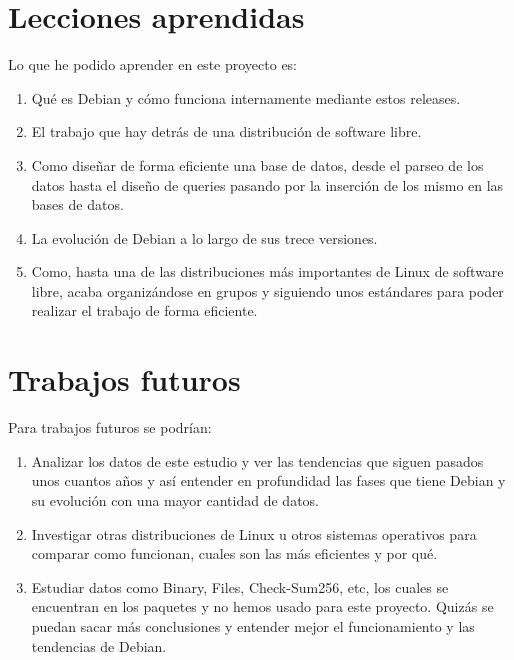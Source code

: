 \documentclass[a4paper, 12pt]{book}
\begin{document}
\section{Lecciones aprendidas}
\label{sec:lecciones_aprendidas}

Lo que he podido aprender en este proyecto es:

\begin{enumerate}
  \item Qué es Debian y cómo funciona internamente mediante estos releases.
  \item El trabajo que hay detrás de una distribución de software libre.
  \item Como diseñar de forma eficiente una base de datos, desde el parseo de los datos hasta el diseño de queries pasando por la inserción de los mismo en las bases de datos.
  \item La evolución de Debian a lo largo de sus trece versiones.
  \item Como, hasta una de las distribuciones más importantes de Linux de software libre, acaba organizándose en grupos y siguiendo unos estándares para poder realizar el trabajo de forma eficiente.
\end{enumerate}


\section{Trabajos futuros}
\label{sec:trabajos_futuros}

Para trabajos futuros se podrían:

\begin{enumerate}
	\item Analizar los datos de este estudio y ver las tendencias que siguen pasados unos cuantos años y así entender en profundidad las fases que tiene Debian y su evolución con una mayor cantidad de datos.
	
	\item Investigar otras distribuciones de Linux u otros sistemas operativos para comparar como funcionan, cuales son las más eficientes y por qué.
	
	\item Estudiar datos como Binary, Files, Check-Sum256, etc, los cuales se encuentran en los paquetes y no hemos usado para este proyecto. Quizás se puedan sacar más conclusiones y entender mejor el funcionamiento y las tendencias de Debian.
\end{enumerate}
\end{document}

